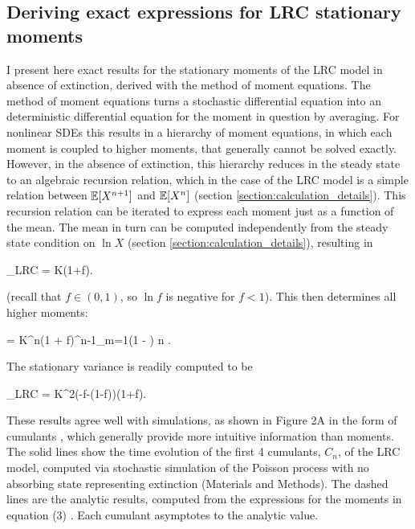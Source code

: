 \subsection{Deriving exact expressions for LRC stationary moments}

I present here exact results for the stationary moments of the LRC model in absence of extinction, derived with the method of moment equations.  The method of moment equations turns a stochastic differential equation into an deterministic differential equation for the moment in question by averaging.  For nonlinear SDEs this results in a hierarchy of moment equations, in which each moment is coupled to higher moments, that generally cannot be solved exactly.  However, in the absence of extinction, this hierarchy reduces in the steady state to an algebraic recursion relation, which in the case of the LRC model is a simple relation between $\mathbb{E}[X^{n+1}]$ and $\mathbb{E}[X^{n}]$ (section \ref{section:calculation_details}).  This recursion relation can be iterated to express each moment just as a function of the mean.  The mean in turn can be computed independently from the steady state condition on $\ln X$ (section \ref{section:calculation_details}), resulting in  

\be
\expec[ X]_{LRC} = K\left(1+\ln f\right).
\ee

\noindent (recall that $f \in (0,1)$, so $\ln f$ is negative for $ f < 1$).  This then determines all higher moments:

\be
\expec[X^n] = K^{n}\left(1 + \ln f\right)\prod^{n-1}_{m=1}\left(1 - \right) \text{,\hspace{1cm}} n .
\ee

\noindent The stationary variance is readily computed to be

\be
 \Var[X]_{LRC} = K^2\left(-\ln f-(1-f)\right)\left(1+\ln f\right).
\ee
  
These results agree well with simulations, as shown in Figure 2A in the form of cumulants \cite{broca2004cumulant}, which generally provide more intuitive information than moments.  The solid lines show the time evolution of the first 4 cumulants, $C_n$, of the LRC model, computed via stochastic simulation of the Poisson process with no absorbing state representing extinction (Materials and Methods).  The dashed lines are the analytic results, computed from the expressions for the moments in equation (3)  \cite{broca2004cumulant}.  Each cumulant asymptotes to the analytic value.



